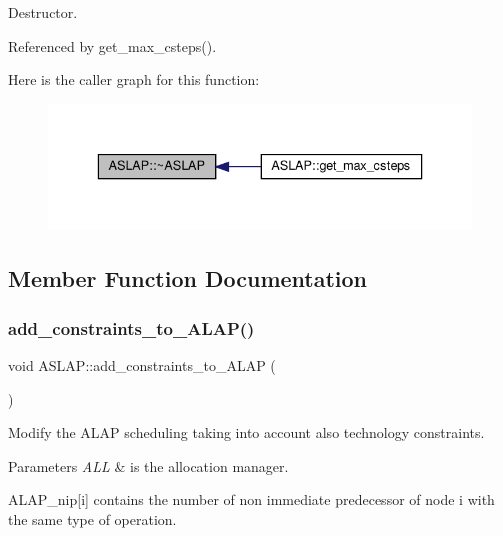 Destructor. 



Referenced by get\+\_\+max\+\_\+csteps().

Here is the caller graph for this function\+:
\nopagebreak
\begin{figure}[H]
\begin{center}
\leavevmode
\includegraphics[width=336pt]{d9/d2a/classASLAP_a5361c6e6c44d526ae2936892203ad734_icgraph}
\end{center}
\end{figure}


\subsection{Member Function Documentation}
\mbox{\label{classASLAP_a3ab73e853dc4b3286cc1e4d76e6e313d}} 
\subsubsection{\texorpdfstring{add\+\_\+constraints\+\_\+to\+\_\+\+A\+L\+A\+P()}{add\_constraints\_to\_ALAP()}}
{\footnotesize\ttfamily void A\+S\+L\+A\+P\+::add\+\_\+constraints\+\_\+to\+\_\+\+A\+L\+AP (\begin{DoxyParamCaption}{ }\end{DoxyParamCaption})\hspace{0.3cm}{\ttfamily [private]}}



Modify the A\+L\+AP scheduling taking into account also technology constraints. 


\begin{DoxyParams}{Parameters}
{\em A\+LL} & is the allocation manager. \\
\hline
\end{DoxyParams}
A\+L\+A\+P\+\_\+nip\mbox{[}i\mbox{]} contains the number of non immediate predecessor of node i with the same type of operation.

